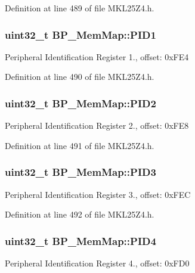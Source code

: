 Definition at line 489 of file M\+K\+L25\+Z4.\+h.

\subsubsection[{\texorpdfstring{P\+I\+D1}{PID1}}]{\setlength{\rightskip}{0pt plus 5cm}uint32\+\_\+t B\+P\+\_\+\+Mem\+Map\+::\+P\+I\+D1}\hypertarget{struct_b_p___mem_map_a2b27e33fff1d3730366050ede44cb7c3}{}\label{struct_b_p___mem_map_a2b27e33fff1d3730366050ede44cb7c3}
Peripheral Identification Register 1., offset\+: 0x\+F\+E4 

Definition at line 490 of file M\+K\+L25\+Z4.\+h.

\subsubsection[{\texorpdfstring{P\+I\+D2}{PID2}}]{\setlength{\rightskip}{0pt plus 5cm}uint32\+\_\+t B\+P\+\_\+\+Mem\+Map\+::\+P\+I\+D2}\hypertarget{struct_b_p___mem_map_a76e6da948034b317948bbe7b794b02c6}{}\label{struct_b_p___mem_map_a76e6da948034b317948bbe7b794b02c6}
Peripheral Identification Register 2., offset\+: 0x\+F\+E8 

Definition at line 491 of file M\+K\+L25\+Z4.\+h.

\subsubsection[{\texorpdfstring{P\+I\+D3}{PID3}}]{\setlength{\rightskip}{0pt plus 5cm}uint32\+\_\+t B\+P\+\_\+\+Mem\+Map\+::\+P\+I\+D3}\hypertarget{struct_b_p___mem_map_a556f1775a26cc79e8ab97c8452ce2c41}{}\label{struct_b_p___mem_map_a556f1775a26cc79e8ab97c8452ce2c41}
Peripheral Identification Register 3., offset\+: 0x\+F\+EC 

Definition at line 492 of file M\+K\+L25\+Z4.\+h.

\subsubsection[{\texorpdfstring{P\+I\+D4}{PID4}}]{\setlength{\rightskip}{0pt plus 5cm}uint32\+\_\+t B\+P\+\_\+\+Mem\+Map\+::\+P\+I\+D4}\hypertarget{struct_b_p___mem_map_a1e7c67c7222aedc5a3c16c5560748793}{}\label{struct_b_p___mem_map_a1e7c67c7222aedc5a3c16c5560748793}
Peripheral Identification Register 4., offset\+: 0x\+F\+D0 

